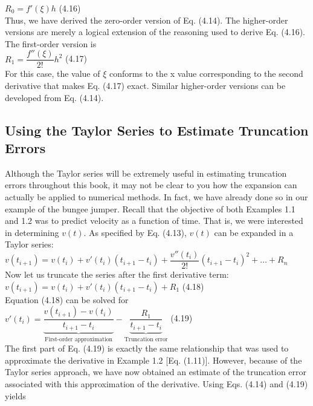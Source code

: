 \documentclass[../main.tex]{subfiles}
\begin{document}
$R_0 = f'(\xi)h$
\hfill
(4.16)\\

\noindent
Thus, we have derived the zero-order version of Eq. (4.14). The higher-order versions
are merely a logical extension of the reasoning used to derive Eq. (4.16). The first-order
version is\\

$R_1 = \dfrac{f''(\xi)}{2!}h^2$
\hfill
(4.17)\\

\noindent
For this case, the value of $\xi$ conforms to the x value corresponding to the second derivative
that makes Eq. (4.17) exact. Similar higher-order versions can be developed from Eq. (4.14).\\

\subsection{Using the Taylor Series to Estimate Truncation Errors}
\noindent
Although the Taylor series will be extremely useful in estimating truncation errors throughout
this book, it may not be clear to you how the expansion can actually be applied to
numerical methods. In fact, we have already done so in our example of the bungee jumper.
Recall that the objective of both Examples 1.1 and 1.2 was to predict velocity as a function
of time. That is, we were interested in determining $v(t)$. As specified by Eq. (4.13), $v(t)$
can be expanded in a Taylor series:\\

$v(t_{i+1}) = v(t_i) + v'(t_i)(t_{i+1} - t_i) + \dfrac{v''(t_i)}{2!}(t_{i+1}-t_i)^2 + \hdots + R_n$\\

\noindent
Now let us truncate the series after the first derivative term:\\

$v(t_{i+1}) = v(t_i) + v'(t_i)(t_{i+1} - t_i) + R_1$
\hfill
(4.18)\\

\noindent
Equation (4.18) can be solved for\\

$v'(t_i) = \underbrace{\dfrac{v(t_{i+1})-v(t_i)}{t_{i+1}-t_i}}_\text{First-order approximation} - 
\underbrace{\dfrac{R_1}{t_{i+1}-t_i}}_\text{Truncation error}$
\hfill
(4.19)\\

\noindent
The first part of Eq. (4.19) is exactly the same relationship that was used to approximate
the derivative in Example 1.2 [Eq. (1.11)]. However, because of the Taylor series approach,
we have now obtained an estimate of the truncation error associated with this approximation
of the derivative. Using Eqs. (4.14) and (4.19) yields\\
\end{document}

